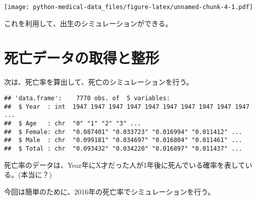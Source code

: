 \documentclass[
]{book}
\newenvironment{Shaded}{\begin{snugshade}}{\end{snugshade}}
\newcommand{\DataTypeTok}[1]{\textcolor[rgb]{0.13,0.29,0.53}{#1}}
\newcommand{\DecValTok}[1]{\textcolor[rgb]{0.00,0.00,0.81}{#1}}
\newcommand{\KeywordTok}[1]{\textcolor[rgb]{0.13,0.29,0.53}{\textbf{#1}}}
\newcommand{\NormalTok}[1]{#1}
\newcommand{\OperatorTok}[1]{\textcolor[rgb]{0.81,0.36,0.00}{\textbf{#1}}}
\newcommand{\OtherTok}[1]{\textcolor[rgb]{0.56,0.35,0.01}{#1}}
\newcommand{\StringTok}[1]{\textcolor[rgb]{0.31,0.60,0.02}{#1}}
\begin{document}
\texttt{[image: python-medical-data\_files/figure-latex/unnamed-chunk-4-1.pdf]}

これを利用して、出生のシミュレーションができる。

\hypertarget{ux6b7bux4ea1ux30c7ux30fcux30bfux306eux53d6ux5f97ux3068ux6574ux5f62}{%
\section{死亡データの取得と整形}\label{ux6b7bux4ea1ux30c7ux30fcux30bfux306eux53d6ux5f97ux3068ux6574ux5f62}}

次は、死亡率を算出して、死亡のシミュレーションを行う。

\begin{Shaded}
\end{Shaded}

\begin{verbatim}
## 'data.frame':	7770 obs. of  5 variables:
##  $ Year  : int  1947 1947 1947 1947 1947 1947 1947 1947 1947 1947 ...
##  $ Age   : chr  "0" "1" "2" "3" ...
##  $ Female: chr  "0.087401" "0.033723" "0.016994" "0.011412" ...
##  $ Male  : chr  "0.099181" "0.034697" "0.016804" "0.011461" ...
##  $ Total : chr  "0.093432" "0.034220" "0.016897" "0.011437" ...
\end{verbatim}

死亡率のデータは、Year年にX才だった人が1年後に死んでいる確率を表している。(本当に？)

今回は簡単のために、2016年の死亡率でシミュレーションを行う。

\begin{Shaded}
\end{Shaded}
\end{document}
